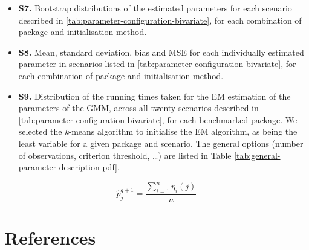 \begin{itemize}
  \begin{itemize}
  \item
    \textbf{S7.} Bootstrap distributions of the estimated parameters for each
    scenario described in \ref{tab:parameter-configuration-bivariate}, for each
    combination of package and initialisation method.
  \item
    \textbf{S8.} Mean, standard deviation, bias and MSE for each individually
    estimated parameter in scenarios listed in \ref{tab:parameter-configuration-bivariate}, for each
    combination of package and initialisation method.
  \item
    \textbf{S9.} Distribution of the running times taken for the EM estimation of the parameters of the GMM, across all twenty scenarios described in \ref{tab:parameter-configuration-bivariate}, for each benchmarked package. We selected the \emph{k}-means
    algorithm to initialise the EM algorithm, as being the least variable for a given package and scenario. The general options (number of observations, criterion threshold, \ldots) are listed in Table \ref{tab:general-parameter-description-pdf}.
  \end{itemize}
\end{itemize}

\[
\hat{p}_j^{q+1}= \frac{\sum_{i=1}^n \eta_{i}(j)}{n}
\]

\hypertarget{references}{%
\section{References}\label{references}}



\address{%
Bastien Chassagnol\\
Laboratoire de Probabilités, Statistiques et Modélisation (LPSM), UMR CNRS 8001\\%
4 Place Jussieu Sorbonne Université\\ 75005, Paris, France\\
%
%
\textit{ORCiD: \href{https://orcid.org/0000-0002-8955-2391}{0000-0002-8955-2391}}\\%
\href{mailto:bastien_chassagnol@laposte.net}{\nolinkurl{bastien\_chassagnol@laposte.net}}%
}

\address{%
Antoine Bichat\\
Les Laboratoires Servier\\%
50 Rue Carnot\\ 92150, Suresnes, France\\
%
\url{https://rdrr.io/github/abichat/abutils/}\\%
\textit{ORCiD: \href{https://orcid.org/0000-0001-6599-7081}{0000-0001-6599-7081}}\\%
\href{mailto:antoine.bichat@servier.com}{\nolinkurl{antoine.bichat@servier.com}}%
}

